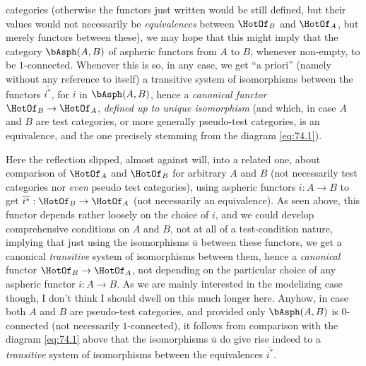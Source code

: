 categories (otherwise the functors just written would be still
defined, but their values would not necessarily be \emph{equivalences}
between $\HotOf_B$ and $\HotOf_A$, but merely functors between these),
we may hope that this might imply that the category $\bAsph(A,B)$ of
aspheric functors from $A$ to $B$, whenever non-empty, to be
$1$-connected. Whenever this is so, in any case, we get ``a priori''
(namely without any reference to \Hot{} itself) a transitive system of
isomorphisms between the functors $\overline{i^*}$, for $i$ in
$\bAsph(A,B)$, hence a \emph{canonical functor} $\HotOf_B\to\HotOf_A$,
\emph{defined up to unique isomorphism} (and which, in case $A$ and
$B$ are test categories, or more generally pseudo-test categories, is
an equivalence, and the one precisely stemming from the diagram
\eqref{eq:74.1}).

\begin{remark}
  Here the reflection slipped, almost against will, into a related
  one, about comparison of $\HotOf_A$ and $\HotOf_B$ for arbitrary $A$
  and $B$ (not necessarily test categories nor \emph{even} pseudo test
  categories), using aspheric functors $i:A\to B$ to get
  $\overline{i^*}:\HotOf_B\to\HotOf_A$ (not necessarily an
  equivalence). As seen above, this functor depends rather loosely on
  the choice of $i$, and we could develop comprehensive conditions on
  $A$ and $B$, not at all of a test-condition nature, implying that
  just using the isomorphisms $\overline u$ between these functors, we
  get a canonical \emph{transitive} system of isomorphisms between
  them, hence a \emph{canonical} functor $\HotOf_B\to\HotOf_A$, not
  depending on the particular choice of any aspheric functor $i:A\to
  B$. As we are mainly interested in the modelizing case though, I
  don't think I should dwell on this much longer here. Anyhow, in case
  both $A$ and $B$ are pseudo-test categories, and provided only
  $\bAsph(A,B)$ is $0$-connected (not necessarily $1$-connected), it
  follows from comparison with the diagram \eqref{eq:74.1} above that
  the isomorphisms $\overline u$ do give rise indeed to a
  \emph{transitive} system of isomorphisms between the equivalences $\overline{i^*}$.
\end{remark}

